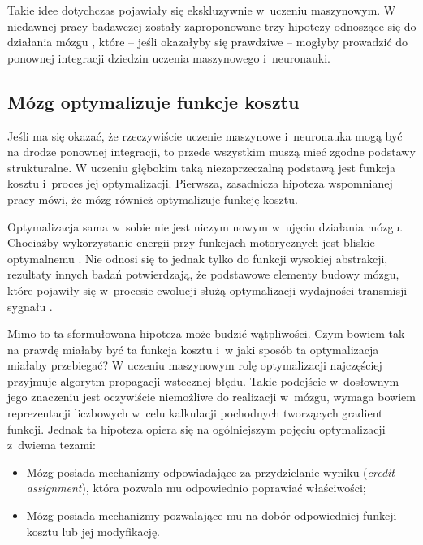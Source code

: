 Takie idee dotychczas pojawiały się ekskluzywnie w~uczeniu maszynowym.
W niedawnej pracy badawczej zostały zaproponowane trzy hipotezy odnoszące się do działania mózgu \cite{marblestone2016toward}, które -- jeśli okazałyby się prawdziwe -- mogłyby prowadzić do ponownej integracji dziedzin uczenia maszynowego i~neuronauki.

\subsection{Mózg optymalizuje funkcje kosztu}
\label{subsec:brain-optimizes-cost-function}

Jeśli ma się okazać, że rzeczywiście uczenie maszynowe i~neuronauka mogą być na drodze ponownej integracji, to przede wszystkim muszą mieć zgodne podstawy strukturalne.
W uczeniu głębokim taką niezaprzeczalną podstawą jest funkcja kosztu i~proces jej optymalizacji.
Pierwsza, zasadnicza hipoteza wspomnianej pracy \cite{marblestone2016toward} mówi, że mózg również optymalizuje funkcję kosztu.

Optymalizacja sama w~sobie nie jest niczym nowym w~ujęciu działania mózgu.
Chociażby wykorzystanie energii przy funkcjach motorycznych jest bliskie optymalnemu \cite{taylor2011does}.
Nie odnosi się to jednak tylko do funkcji wysokiej abstrakcji, rezultaty innych badań potwierdzają, że podstawowe elementy budowy mózgu, które pojawiły się w~procesie ewolucji służą optymalizacji wydajności transmisji sygnału \cite{paprocki2020optimizing}.

Mimo to ta sformułowana hipoteza może budzić wątpliwości.
Czym bowiem tak na prawdę miałaby być ta funkcja kosztu i~w jaki sposób ta optymalizacja miałaby przebiegać?
W uczeniu maszynowym rolę optymalizacji najczęściej przyjmuje algorytm propagacji wstecznej błędu.
Takie podejście w~dosłownym jego znaczeniu jest oczywiście niemożliwe do realizacji w~mózgu, wymaga bowiem reprezentacji liczbowych w~celu kalkulacji pochodnych tworzących gradient funkcji.
Jednak ta hipoteza opiera się na ogólniejszym pojęciu optymalizacji z~dwiema tezami:

\begin{itemize}
	\item Mózg posiada mechanizmy odpowiadające za przydzielanie wyniku (\emph{credit assignment}), która pozwala mu odpowiednio poprawiać właściwości;
	\item Mózg posiada mechanizmy pozwalające mu na dobór odpowiedniej funkcji kosztu lub jej modyfikację.
\end{itemize}


